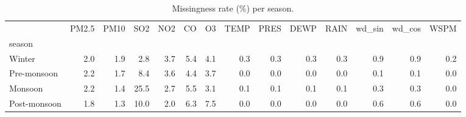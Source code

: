 \begin{table}
\caption{Missingness rate (\%) per season.}
\label{tab:missingness_season}
\begin{tabular}{lrrrrrrrrrrrrr}
\toprule
 & PM2.5 & PM10 & SO2 & NO2 & CO & O3 & TEMP & PRES & DEWP & RAIN & wd\_sin & wd\_cos & WSPM \\
season &  &  &  &  &  &  &  &  &  &  &  &  &  \\
\midrule
Winter & 2.0 & 1.9 & 2.8 & 3.7 & 5.4 & 4.1 & 0.3 & 0.3 & 0.3 & 0.3 & 0.9 & 0.9 & 0.2 \\
Pre-monsoon & 2.2 & 1.7 & 8.4 & 3.6 & 4.4 & 3.7 & 0.0 & 0.0 & 0.0 & 0.0 & 0.1 & 0.1 & 0.0 \\
Monsoon & 2.2 & 1.4 & 25.5 & 2.7 & 5.5 & 3.1 & 0.1 & 0.1 & 0.1 & 0.1 & 0.3 & 0.3 & 0.0 \\
Post-monsoon & 1.8 & 1.3 & 10.0 & 2.0 & 6.3 & 7.5 & 0.0 & 0.0 & 0.0 & 0.0 & 0.6 & 0.6 & 0.0 \\
\bottomrule
\end{tabular}
\end{table}
